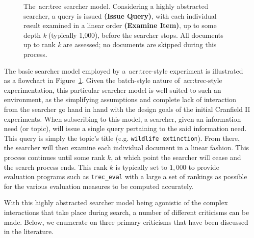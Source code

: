 \begin{figure}[t!]
    \centering
    \caption[Flowchart of the abstracted~\gls{acr:trec} searcher model]{The~\gls{acr:trec} searcher model. Considering a highly abstracted searcher, a query is issued \textbf{(Issue Query)}, with each individual result examined in a linear order \textbf{(Examine Item)}, up to some depth \emph{k} (typically 1,000), before the searcher stops. All documents up to rank \emph{k} are assessed; no documents are skipped during this process.}
    \label{fig:trec_model}
\end{figure}

The basic searcher model employed by a~\gls{acr:trec}-style experiment is illustrated as a flowchart in Figure~\ref{fig:trec_model}. Given the batch-style nature of~\gls{acr:trec}-style experimentation, this particular searcher model is well suited to such an environment, as the simplifying assumptions and complete lack of interaction from the searcher go hand in hand with the design goals of the initial Cranfield II experiments. When subscribing to this model, a searcher, given an information need (or topic), will issue a single query pertaining to the said information need. This query is simply the topic's title (e.g. \texttt{wildlife extinction}). From there, the searcher will then examine each individual document in a linear fashion. This process continues until some rank $k$, at which point the searcher will cease and the search process ends. This rank $k$ is typically set to $1,000$ to provide evaluation programs such as \texttt{trec\_eval} with a large a set of rankings as possible for the various evaluation measures to be computed accurately.

With this highly abstracted searcher model being agonistic of the complex interactions that take place during search, a number of different criticisms can be made. Below, we enumerate on three primary criticisms that have been discussed in the literature.

